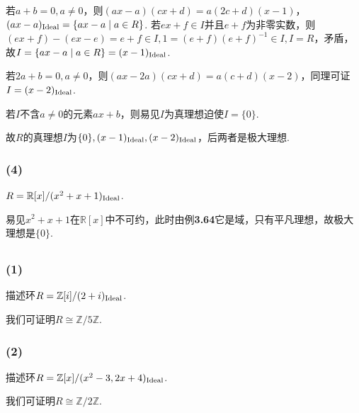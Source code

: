 若$a+b=0, a\neq 0$，则$(ax-a)(cx+d)=a(2c+d)(x-1)$，$(ax-a)_{\operatorname{Ideal}}=\{ax-a\mid a\in R\}$. 若$ex+f\in I$并且$e+f$为非零实数，则$(ex+f)-(ex-e)=e+f\in I, 1=(e+f)(e+f)^{-1}\in I, I=R$，矛盾，故$I=\{ax-a\mid a\in R\}=(x-1)_{\operatorname{Ideal}}$.

若$2a+b=0, a\neq 0$，则$(ax-2a)(cx+d)=a(c+d)(x-2)$，同理可证$I=(x-2)_{\operatorname{Ideal}}$.

若$I$不含$a\neq 0$的元素$ax+b$，则易见$I$为真理想迫使$I=\{0\}$.

故$R$的真理想$I$为$\{0\}, (x-1)_{\operatorname{Ideal}}, (x-2)_{\operatorname{Ideal}}$，后两者是极大理想.

\subsubsection{(4)}
$R=\mathbb{R}[x]/(x^2+x+1)_{\operatorname{Ideal}}$.

\jie 易见$x^2+x+1$在$\mathbb{R}[x]$中不可约，此时由{\heiti 例}\textbf{3.64}它是域，只有平凡理想，故极大理想是$\{0\}$.

\subsection{}
\subsubsection{(1)}
描述环$R=\mathbb{Z}[i]/(2+i)_{\operatorname{Ideal}}$.

\jie 我们可证明$R\cong \mathbb{Z}/5\mathbb{Z}$.


\subsubsection{(2)}
描述环$R=\mathbb{Z}[x]/(x^2-3,2x+4)_{\operatorname{Ideal}}$.

\jie 我们可证明$R\cong \mathbb{Z}/2\mathbb{Z}$.


